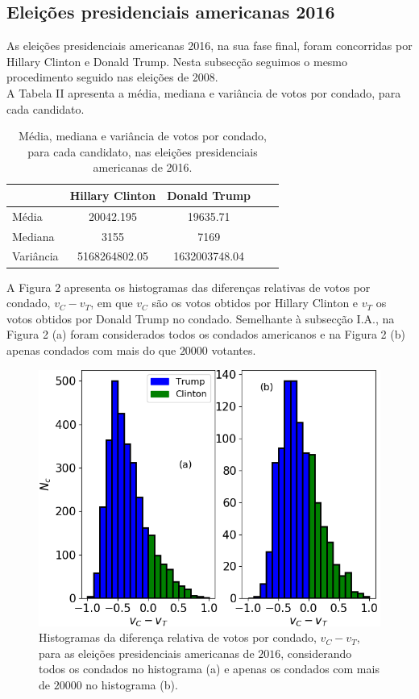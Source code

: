 \documentclass[aps,pre,twocolumn,showpacs,amsmath,amssymb]{revtex4-1}
\begin{document}
\subsection{Eleições presidenciais americanas 2016}
As eleições presidenciais americanas 2016, na sua fase final, foram concorridas por Hillary Clinton e Donald Trump. Nesta subsecção seguimos o mesmo procedimento seguido nas eleições de 2008.\\
A Tabela II apresenta a média, mediana e variância de votos por condado, para cada candidato.\\
\begin{table}[hbt!]
\caption{Média, mediana e variância de votos por condado, para cada candidato, nas eleições presidenciais americanas de 2016.}
\begin{tabular}{|l|c|c|c|c|}
\hline
 & Hillary Clinton & Donald Trump \\ \hline
Média & 20042.195 & 19635.71 \\ \hline
Mediana & 3155 & 7169 \\ \hline
Variância & 5168264802.05 & 1632003748.04 \\ \hline
\end{tabular}
\end{table}
A Figura 2 apresenta os histogramas das diferenças relativas de votos por condado, $v_C-v_T$, em que $v_C$ são os votos obtidos por Hillary Clinton e $v_T$ os votos obtidos por Donald Trump no condado. Semelhante à subsecção I.A., na Figura  2 (a) foram considerados todos os condados americanos e na Figura 2 (b) apenas condados com mais do que $20000$ votantes.

\begin{figure}[hbt!]
    \includegraphics[scale=0.53,left]{clintontrumpcounties.png}
    \caption{Histogramas da diferença relativa de votos por condado, $v_C-v_T$, para as eleições presidenciais americanas de $2016$, considerando todos os condados no histograma (a) e apenas os condados com mais de $20000$ no histograma (b).}
\end{figure}
\end{document}

